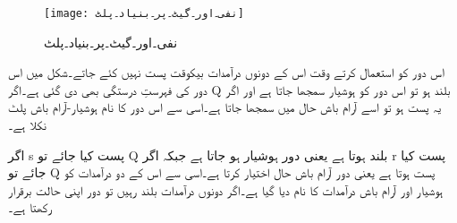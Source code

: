 \begin{figure}[th]
 \begin{center}
  \texttt{[image: نفی۔اور۔گیٹ۔پر۔بنیاد۔پلٹ]}
 \end{center}
\caption{نفی۔اور۔گیٹ۔پر۔بنیاد۔پلٹ}
\label{شکل۔نفی۔اور۔گیٹ۔پر۔بنیاد۔پلٹ}
\end{figure}

اس دور کو استعمال کرتے وقت اس کے دونوں درآمدات بیکوقت پست نہیں کئے جاتے۔شکل میں اس دور کی فہرستِ درستگی بھی دی گئی ہے۔اگر Q بلند ہو تو اس دور کو ہوشیار سمجھا جاتا ہے اور اگر یہ پست ہو تو اسے آرام باش حال میں سمجھا جاتا ہے۔اسی سے اس دور کا نام ہوشیار-آرام باش پلٹ نکلا ہے۔

اگر s پست کیا جائے تو Q بلند ہوتا ہے یعنی دور ہوشیار ہو جاتا ہے جبکہ اگر r پست کیا جائے تو Q پست ہوتا ہے یعنی دور آرام باش حال اختیار کرتا ہے۔اسی سے اس کے دو درآمدات کو ہوشیار اور آرام باش درآمدات کا نام دیا گیا ہے۔اگر دونوں درآمدات بلند رہیں تو دور اپنی حالت برقرار رکھتا ہے۔

